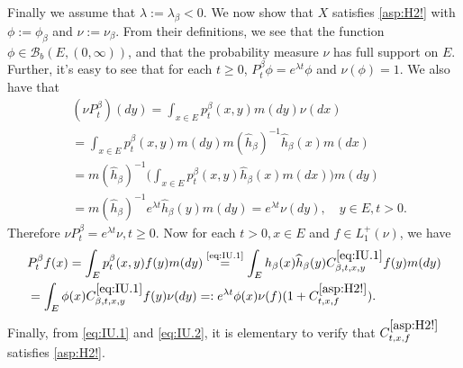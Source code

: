 \documentclass[12pt,a4paper]{amsart}
\numberwithin{equation}{section}
\theoremstyle{plain}
\theoremstyle{definition}
\theoremstyle{remark}
\begin{document}
	Finally we assume that $\lambda := \lambda_\beta < 0$. We now show that $X$ satisfies \eqref{asp:H2!} with $\phi:=\phi_\beta$ and $\nu:= \nu_\beta$.
	From their definitions, we see that the function $\phi \in \mathcal B_b(E,(0,\infty))$, and that the probability measure $\nu$ has full support on $E$.
	Further, it's easy to see that for each $t\geq 0$, $P_t^\beta \phi = e^{\lambda t}\phi$ and $\nu(\phi) = 1$.
	We also have that
\begin{align}
	&(\nu P_t^\beta)(dy) = \int_{x\in E}p_{t}^\beta(x,y)m(dy) \nu(dx)
	\\&= \int_{x\in E}p_{t}^\beta(x,y)m(dy) m(\widehat h_\beta)^{-1}\widehat h_\beta(x)m(dx)
	\\&=  m(\widehat h_\beta)^{-1}  \Big(\int_{x\in E} p_t^\beta(x,y) \widehat h_\beta(x) m(dx) \Big) m(dy)
	\\& = m(\widehat h_\beta)^{-1} e^{\lambda t}\widehat h_\beta(y) m(dy) = e^{\lambda t}\nu(dy), \quad y \in E, t>0.
\end{align}
	Therefore $\nu P_t^\beta = e^{\lambda t}\nu, t\geq 0$. Now for each $t>0, x \in E$ and $f\in L_1^+(\nu)$, we have
\begin{align}
	&P_t^\beta f(x) = \int_{E} p^\beta_t(x,y) f(y)m(dy)
	\overset{\text{\eqref{eq:IU.1}}}= \int_{E} h_\beta (x) \widehat h_\beta (y) C^{\eqref{eq:IU.1}}_{\beta,t,x,y} f(y) m(dy)
	\\&= \int_{E} \phi (x)  C^{\eqref{eq:IU.1}}_{\beta,t,x,y} f(y) \nu(dy)
	=: e^{\lambda t} \phi(x) \nu(f) (1+ C^{\eqref{asp:H2!}}_{t,x,f}).
\end{align}
	Finally, from \eqref{eq:IU.1} and \eqref{eq:IU.2}, it is elementary to verify that $C^{\eqref{asp:H2!}}_{t,x,f}$ satisfies \eqref{asp:H2!}.
\end{document}
